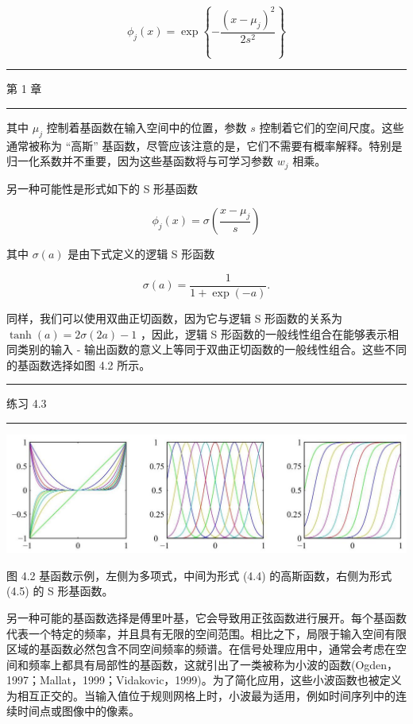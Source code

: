 \documentclass[10pt]{report}
\newcommand{\HRule}{\begin{center}\rule{0.9\linewidth}{0.2mm}\end{center}}
\begin{document}
\[
{\phi }_{j}\left( x\right)  = \exp \left\{  {-\frac{{\left( x - {\mu }_{j}\right) }^{2}}{2{s}^{2}}}\right\}   \tag{4.4}
\]

\HRule

第 1 章

\HRule

其中 \({\mu }_{j}\) 控制着基函数在输入空间中的位置，参数 \(s\) 控制着它们的空间尺度。这些通常被称为 “高斯” 基函数，尽管应该注意的是，它们不需要有概率解释。特别是归一化系数并不重要，因为这些基函数将与可学习参数 \({w}_{j}\) 相乘。

另一种可能性是形式如下的 S 形基函数

\[
{\phi }_{j}\left( x\right)  = \sigma \left( \frac{x - {\mu }_{j}}{s}\right)  \tag{4.5}
\]

其中 \(\sigma \left( a\right)\) 是由下式定义的逻辑 S 形函数

\[
\sigma \left( a\right)  = \frac{1}{1 + \exp \left( {-a}\right) }. \tag{4.6}
\]

同样，我们可以使用双曲正切函数，因为它与逻辑 S 形函数的关系为 \(\tanh \left( a\right)  = {2\sigma }\left( {2a}\right)  - 1\) ，因此，逻辑 S 形函数的一般线性组合在能够表示相同类别的输入 - 输出函数的意义上等同于双曲正切函数的一般线性组合。这些不同的基函数选择如图 4.2 所示。

\HRule

练习 4.3

\HRule

\begin{center}
\includegraphics[max width=1.0\textwidth]{images/0194e279-9b28-703a-88f4-c3ac21e2010d_133_227_365_1298_385_0.jpg}
\end{center}
\hspace*{3em} 

图 4.2 基函数示例，左侧为多项式，中间为形式 (4.4) 的高斯函数，右侧为形式 (4.5) 的 S 形基函数。

另一种可能的基函数选择是傅里叶基，它会导致用正弦函数进行展开。每个基函数代表一个特定的频率，并且具有无限的空间范围。相比之下，局限于输入空间有限区域的基函数必然包含不同空间频率的频谱。在信号处理应用中，通常会考虑在空间和频率上都具有局部性的基函数，这就引出了一类被称为小波的函数(Ogden，1997；Mallat，1999；Vidakovic，1999)。为了简化应用，这些小波函数也被定义为相互正交的。当输入值位于规则网格上时，小波最为适用，例如时间序列中的连续时间点或图像中的像素。
\end{document}
